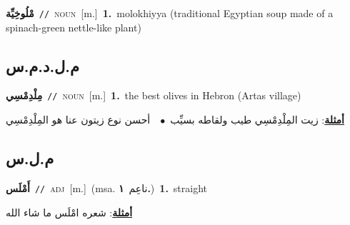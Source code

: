 \documentclass[10pt,a4paper,twoside]{article} %
\begin{document}
\begin{multicols}{2}
{\setlength\topsep{0pt}\textbf{\foreignlanguage{arabic}{مْلُوخِيِّة}}\ {\color{gray}\texttt{//}\color{black}}\ \textsc{noun}\ [m.]\ \textbf{1.}~molokhiyya (traditional Egyptian soup made of a spinach-green nettle-like plant)\ } \vspace{2mm}

\vspace{-3mm}
\subsection*{\color{blue}\foreignlanguage{arabic}{م.ل.د.م.س}\color{blue}{ (ntws)}} 

{\setlength\topsep{0pt}\textbf{\foreignlanguage{arabic}{مِلْدِمْسِي}}\ {\color{gray}\texttt{//}\color{black}}\ \textsc{noun}\ [m.]\ \textbf{1.}~the best olives in Hebron (Artas village)\  \begin{flushright}\color{gray}\foreignlanguage{arabic}{\textbf{\underline{\foreignlanguage{arabic}{أمثلة}}}: زيت المِلْدِمْسِي طيب ولقاطه بسيِّب\ $\bullet$\ \  أحسن نوع  زيتون عنا هو المِلْدِمْسِي}\end{flushright}\color{black}} \vspace{2mm}

\vspace{-3mm}
\subsection*{\color{blue}\foreignlanguage{arabic}{م.ل.س}\color{blue}{}} 

{\setlength\topsep{0pt}\textbf{\foreignlanguage{arabic}{أَمْلَس}}\ {\color{gray}\texttt{//}\color{black}}\ \textsc{adj}\ [m.]\ \color{gray}(msa. \foreignlanguage{arabic}{ناعِم}~\foreignlanguage{arabic}{\textbf{١.}})\color{black}\ \textbf{1.}~straight\  \begin{flushright}\color{gray}\foreignlanguage{arabic}{\textbf{\underline{\foreignlanguage{arabic}{أمثلة}}}: شعره امْلَس ما شاء الله}\end{flushright}\color{black}} \vspace{2mm}


\end{multicols}
\end{document}
